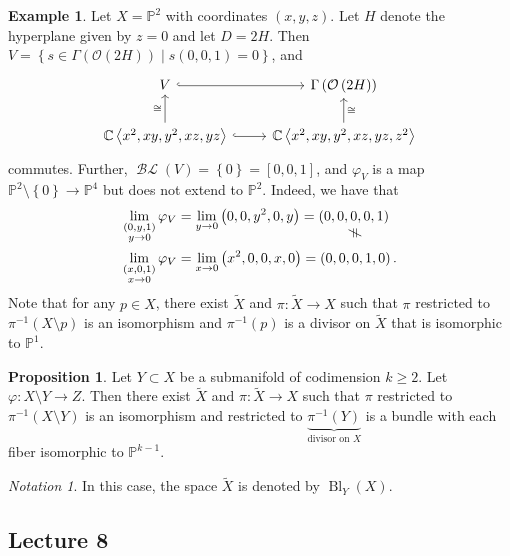 \documentclass[10pt,letterpaper,cm]{nupset}
\theoremstyle{definition}
\newtheorem{exmp}[defn]{Example}
\theoremstyle{theorem}
\newtheorem{prop}[defn]{Proposition}
\theoremstyle{remark}
\newtheorem*{notation}{Notation}
\newcommand{\C}{\mathbb C}
\renewcommand{\O}{\mathcal O}
\renewcommand{\P}{\mathbb P}
\newcommand{\1}{\mathbb{1}}
\newcommand{\0}{\vec 0}
\DeclareMathOperator{\BL}{\mathcal{BL}}
\DeclareMathOperator{\bl}{\mathrm{Bl}}
\newcommand{\vertneq}{\rotatebox{90}{$\,\neq$}}
\newcommand{\net}[2]{\underset{\scriptstyle\overset{\mkern4mu\vertneq}{#2}}{#1}}
\begin{document}
\begin{exmp}
Let $X = \P^2$ with coordinates $\left(x,y,z\right)$. Let $H$ denote the hyperplane given by $z=0$ and let $D = 2{H}$. Then $ V= \left\{s\in \Gamma  \left(\O\left(2{H}\right)\right) \mid s\left(0,0,1\right) =0\right\}$, and
\[
\begin{tikzcd}
V \arrow[r, hook]                                                         & \Gamma\left(\O\left(2{H}\right)\right)                           \\
{\C\left\langle x^2, xy, y^2, xz,yz\right\rangle} \arrow[r, hook] \arrow[u, "\cong"] & {\C\left\langle x^2, xy, y^2, xz, yz, z^2\right\rangle} \arrow[u, "\cong"']
\end{tikzcd}
\] commutes. Further, $\BL(V) = \left\{0\right\} = \left[0,0,1\right]$, and $\varphi_V$ is a map $\P^2 \setminus \left\{0\right\} \to \P^4$ but does not extend to $\P^2$. Indeed, we have that
\begin{align*}
\lim_{\substack{\left(0, y, 1\right) \\ y\to 0}} \varphi_V  & = \lim_{y\to0}\left(0,0,y^2,0, y\right)= \net{\left(0,0,0,0,1\right)}{}
\\ \lim_{\substack{\left(x, 0, 1\right) \\ x\to 0}} \varphi_V  & = \lim_{x\to0}\left(x^2,0,0,x, 0\right)= \left(0,0,0,1,0\right).
\end{align*} Note that for any $p\in X$, there exist $\widetilde{X}$ and $\pi : \widetilde{X}\to X$ such that $\pi$ restricted to $\pi^{-1}\left(X\setminus p\right)$ is an isomorphism and $\pi^{-1}(p)$ is a divisor on $\widetilde{X}$ that is isomorphic to $\P^1$.
\end{exmp}

\begin{prop}
Let $Y \subset X$ be a submanifold of codimension $k\geq 2$. Let $\varphi : X \setminus Y \to Z$. Then there exist $\widetilde{X}$ and $\pi : \widetilde{X}\to X$ such that $\pi$ restricted to $\pi^{-1}\left(X\setminus Y\right)$ is an isomorphism and restricted to $\underbrace{\pi^{-1}(Y)}_{\text{divisor on }X}$ is a bundle with each fiber isomorphic to $\P^{k-1}$.
\end{prop}

\begin{notation}
In this case, the space $\widetilde{X}$ is denoted by $\bl_Y(X)$.
\end{notation}

\subsection{Lecture 8}
\end{document}
